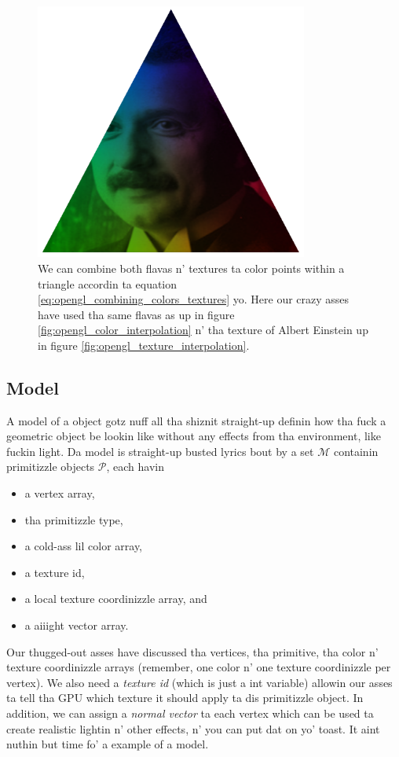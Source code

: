 \begin{figure}[h]
\begin{center}
\includegraphics[width=0.8\textwidth, trim=0cm 0cm 0cm 0cm, clip]{opengl/figures/color_and_texture.png}
\end{center}
\caption{We can combine both flavas n' textures ta color points within a triangle accordin ta equation \eqref{eq:opengl_combining_colors_textures} yo. Here our crazy asses have used tha same flavas as up in figure \ref{fig:opengl_color_interpolation} n' tha texture of Albert Einstein up in figure \ref{fig:opengl_texture_interpolation}.}
\label{fig:color_and_texture}
\end{figure}

\subsection{Model}
\label{sec:opengl_model}
A model of a object gotz nuff all tha shiznit straight-up definin how tha fuck a geometric object be lookin like without any effects from tha environment, like fuckin light. Da model is straight-up busted lyrics bout by a set $\mathcal{M}$ containin primitizzle objects $\mathcal{P}$, each havin 
\begin{itemize}
	\item a vertex array,
	\item tha primitizzle type,
	\item a cold-ass lil color array,
	\item a texture id,
	\item a local texture coordinizzle array, and
	\item a aiiight vector array.
\end{itemize}
Our thugged-out asses have discussed tha vertices, tha primitive, tha color n' texture coordinizzle arrays (remember, one color n' one texture coordinizzle per vertex). We also need a \textit{texture id} (which is just a int variable) allowin our asses ta tell tha GPU which texture it should apply ta dis primitizzle object. In addition, we can assign a \textit{normal vector} ta each vertex which can be used ta create realistic lightin n' other effects, n' you can put dat on yo' toast. It aint nuthin but time fo' a example of a model.

